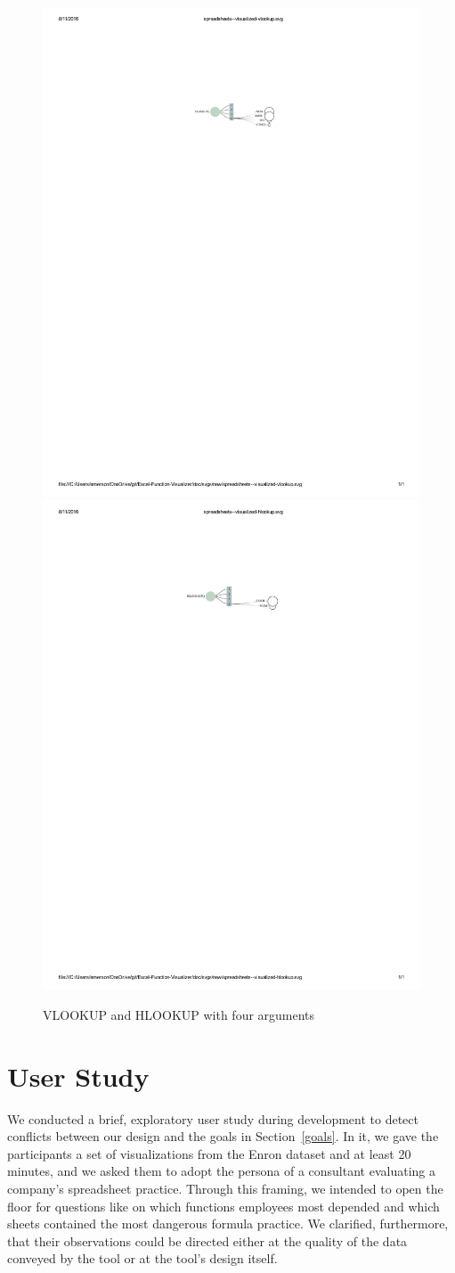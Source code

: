 \documentclass[conference]{IEEEtran}
\begin{document}
	\begin{figure}[h] \centering \includegraphics[width=.5\textwidth]{vlookup}
		\includegraphics[width=.5\textwidth]{hlookup} \caption{VLOOKUP and HLOOKUP with
			four arguments} \label{fig:vhlookups}\end{figure}
	
	\section{User Study} \label{sec:userstudy} 

	We conducted a brief, exploratory user study during development to detect
	conflicts between our design and the goals in Section~\ref{goals}. In it, we
	gave the participants a set of visualizations from the Enron dataset and at
	least 20 minutes, and we asked them to adopt the persona of a consultant
	evaluating a company's spreadsheet practice. Through this framing, we intended
	to open the floor for questions like on which functions employees most depended
	and which sheets contained the most dangerous formula practice. We clarified,
	furthermore, that their observations could be directed either at the quality of
	the data conveyed by the tool or at the tool's design itself.
	
\end{document}
